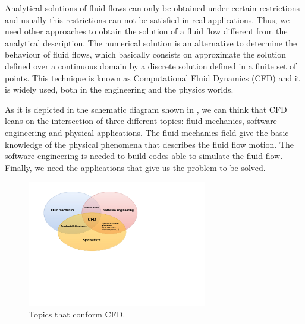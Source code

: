 Analytical solutions of fluid flows can only be obtained under certain restrictions and usually this restrictions can not be satisfied in real applications. Thus, we need other approaches to obtain the solution of a fluid flow different from the analytical description. The numerical solution is an alternative to determine the behaviour of fluid flows, which basically consists on approximate the solution defined over a continuous domain by a discrete solution defined in a finite set of points. This technique is known as Computational Fluid Dynamics (CFD) and it is widely used, both in the engineering and the physics worlds.

As it is depicted in the schematic diagram shown in , we can think that CFD leans on the intersection of three different topics: fluid mechanics, software engineering and physical applications. The fluid mechanics field give the basic knowledge of the physical phenomena that describes the fluid flow motion. The software engineering is needed to build codes able to simulate the fluid flow. Finally, we need the applications that give us the problem to be solved.

\begin{figure}[h!]
	\centering	
	\includegraphics[trim=2cm 9cm 11cm 1cm,clip=true,width=0.7\textwidth]{Figures/Chapter1/CFD_scheme}
	\caption{Topics that conform CFD.}
	\label{fig-CFD}
\end{figure}


